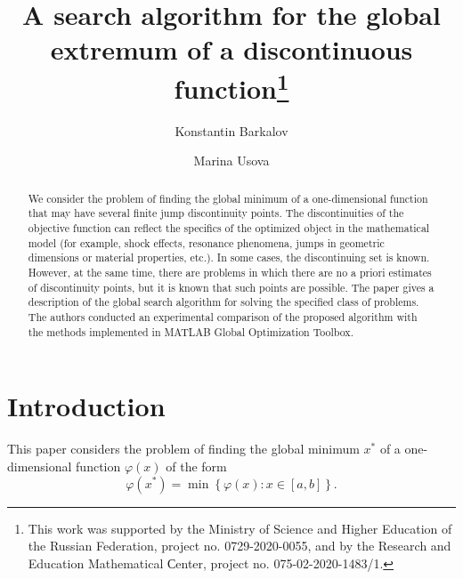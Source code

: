 \documentclass[runningheads]{llncs}
\begin{document}
%
\title{A search algorithm for the global extremum \break of a discontinuous function\thanks{This work was supported by the Ministry of Science and Higher Education of the Russian Federation, project no. 0729-2020-0055, and by the Research and Education Mathematical Сenter, project no. 075-02-2020-1483/1.}}
%
%
\author{Konstantin Barkalov   
\and Marina Usova 
}
%
%
%
\maketitle              %
%
\begin{abstract}
We consider the problem of finding the global minimum of a one-dimensional function that may have several finite jump discontinuity points. The discontinuities of the objective function can reflect the specifics of the optimized object in the mathematical model (for example, shock effects, resonance phenomena, jumps in geometric dimensions or material properties, etc.). In some cases, the discontinuing set is known. However, at the same time, there are problems in which there are no a priori estimates of discontinuity points, but it is known that such points are possible. The paper gives a description of the global search algorithm for solving the specified class of problems. The authors conducted an experimental comparison of the proposed algorithm with the methods implemented in MATLAB Global Optimization Toolbox.


\end{abstract}
%
%
%
\section{Introduction}

This paper considers the problem of finding the global minimum $x^*$ of a one-dimensional function $\varphi(x)$ of the form 
\begin{equation}\label{problem}
\varphi(x^*)=\min\left\{\varphi(x):x\in\left[a,b\right]\right\}.
\end{equation}
\end{document}
